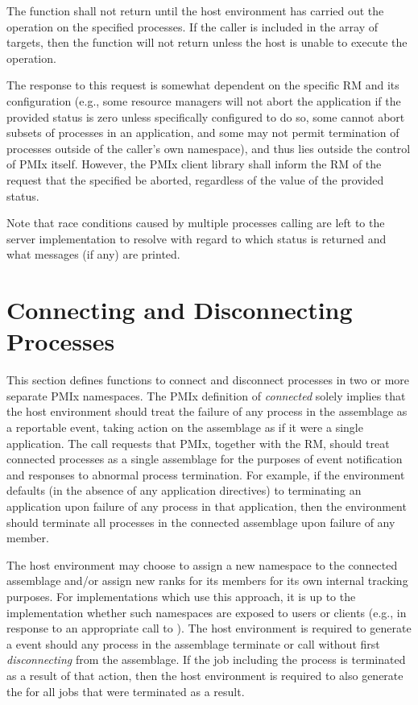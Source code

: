The function shall not return until the host environment has carried out the operation on the specified processes. If the caller is included in the array of targets, then the function will not return unless the host is unable to execute the operation.

\adviceuserstart
The response to this request is somewhat dependent on the specific \ac{RM} and its configuration (e.g., some resource managers will not abort the application if the provided status is zero unless specifically configured to do so, some cannot abort subsets of processes in an application, and some may not permit termination of processes outside of the caller's own namespace), and thus lies outside the control of PMIx itself.
However, the PMIx client library shall inform the \ac{RM} of the request that the specified  be aborted, regardless of the value of the provided status.

Note that race conditions caused by multiple processes calling  are left to the server implementation to resolve with regard to which status is returned and what messages (if any) are printed.
\adviceuserend


\section{Connecting and Disconnecting Processes}
\label{chap:api_proc_mgmt:connect}

This section defines functions to connect and disconnect processes in two or more separate \ac{PMIx} namespaces.
The \ac{PMIx} definition of \textit{connected} solely implies that the host environment should treat the failure of any process in the assemblage as a reportable event, taking action on the assemblage as if it were a single application.
The call requests that \ac{PMIx}, together with the \ac{RM}, should treat connected processes as a single assemblage for the purposes of event notification and responses to abnormal process termination.
For example, if the environment defaults (in the absence of any application directives) to terminating an application upon failure of any process in that application, then the environment should terminate all processes in the connected assemblage upon failure of any member.

The host environment may choose to assign a new namespace to the connected assemblage and/or assign new ranks for its members for its own internal tracking purposes.  For implementations which use this approach, it is up to the implementation whether such namespaces are exposed to users or clients (e.g., in response to an appropriate call to ). The host environment is required to generate a  event should any process in the assemblage terminate or call  without first \textit{disconnecting} from the assemblage. If the job including the process is terminated as a result of that action, then the host environment is required to also generate the  for all jobs that were terminated as a result.

